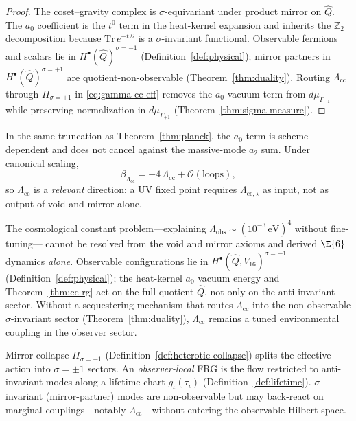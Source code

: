 \begin{proof}
The coset--gravity complex is $\sigma$-equivariant under product mirror on
$\hat Q$. The $a_0$ coefficient is the $t^0$ term in the heat-kernel
expansion and inherits the $\mathbb{Z}_2$ decomposition because
$\mathrm{Tr}\,e^{-t\mathcal{D}}$ is a $\sigma$-invariant functional.
Observable fermions and scalars lie in $H^\bullet(\hat Q)^{\sigma=-1}$
(Definition~\ref{def:physical}); mirror partners in
$H^\bullet(\hat Q)^{\sigma=+1}$ are quotient-non-observable
(Theorem~\ref{thm:duality}). Routing $\Lambda_{\mathrm{cc}}$ through
$\Pi_{\sigma=+1}$ in \eqref{eq:gamma-cc-eff} removes the $a_0$ vacuum term
from $d\mu_{\Gamma_{-1}}$ while preserving normalization in
$d\mu_{\Gamma_{+1}}$ (Theorem~\ref{thm:sigma-measure}).
\end{proof}

\begin{theorem}\label{thm:cc-rg}
In the same truncation as Theorem~\ref{thm:planck}, the $a_0$ term is
scheme-dependent and does not cancel against the massive-mode $a_2$ sum. Under
canonical scaling,
\begin{equation}\label{eq:beta-Lambda}
  \beta_{\Lambda_{\mathrm{cc}}}
  =-4\,\Lambda_{\mathrm{cc}}+\mathcal{O}(\text{loops}),
\end{equation}
so $\Lambda_{\mathrm{cc}}$ is a \emph{relevant} direction: a UV fixed point
requires $\Lambda_{\mathrm{cc},\star}$ as input, not as output of void and
mirror alone.
\end{theorem}

\begin{proposition}
\label{prop:cc-nogo}
The cosmological constant problem---explaining
$\Lambda_{\mathrm{obs}}\sim(10^{-3}\,\mathrm{eV})^4$ without fine-tuning---
cannot be resolved from the void and mirror axioms and derived $\E{6}$
dynamics \emph{alone}. Observable configurations lie in
$H^\bullet(\hat Q,V_{16})^{\sigma=-1}$ (Definition~\ref{def:physical}); the
heat-kernel $a_0$ vacuum energy and Theorem~\ref{thm:cc-rg} act on the full
quotient $\hat Q$, not only on the anti-invariant sector. Without a
sequestering mechanism that routes $\Lambda_{\mathrm{cc}}$ into the
non-observable $\sigma$-invariant sector (Theorem~\ref{thm:duality}),
$\Lambda_{\mathrm{cc}}$ remains a tuned environmental coupling in the
observer sector.
\end{proposition}

\begin{remark}\label{rmk:observer-frg}
Mirror collapse $\Pi_{\sigma=-1}$ (Definition~\ref{def:heterotic-collapse})
splits the effective action into $\sigma=\pm1$ sectors. An \emph{observer-local}
FRG is the flow restricted to anti-invariant modes along a lifetime chart
$g_\iota(\tau_\iota)$ (Definition~\ref{def:lifetime}). $\sigma$-invariant
(mirror-partner) modes are non-observable but may back-react on marginal
couplings---notably $\Lambda_{\mathrm{cc}}$---without entering the observable
Hilbert space.
\end{remark}

